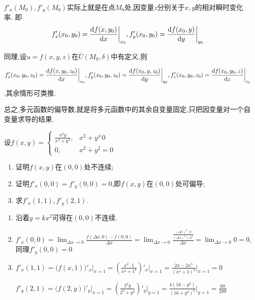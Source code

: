 $f'_x(M_0),f'_y(M_0)$实际上就是在点$M_0$处,因变量$z$分别关于$x,y$的相对瞬时变化率.
即$$f'_x(x_0,y_0)=\frac{\operatorname{d\!}{}f(x,y_0)}{\operatorname{d\!}{}x}\bigg|_{x_0},f'_y(x_0,y_0)=\frac{\operatorname{d\!}{}f(x_0,y)}{\operatorname{d\!}{}y}\bigg|_{y_0}$$

同理,设$u=f(x,y,z)$在$\bar{U}(M_0,\delta)$中有定义,则

$$f'_x(x_0,y_0,z_0)=\frac{\operatorname{d\!}{}f(x,y_0,z_0)}{\operatorname{d\!}{}x}\bigg|_{x_0},f'_y(x_0,y_0,z_0)=\frac{\operatorname{d\!}{}f(x_0,y,z_0)}{\operatorname{d\!}{}y}\bigg|_{y_0},f'_z(x_0,y_0,z_0)=\frac{\operatorname{d\!}{}f(x_0,y_0,z)}{\operatorname{d\!}{}z}\bigg|_{z_0}$$,其余情形可类推.

总之,多元函数的偏导数,就是将多元函数中的其余自变量固定,只把因变量对一个自变量求导的结果.

\begin{example}
    设$f(x,y)=\begin{cases}
        \frac{x^2y}{x^4+y^2},&x^2+y^\neq0\\
        0,&x^2+y^2=0
    \end{cases}$
    \begin{enumerate}
        \item 证明$f(x,y)$在$(0,0)$处不连续;
        \item 证明$f'_x(0,0)=f'_y(0,0)=0$,即$f(x,y)$在$(0,0)$处可偏导;
        \item 求$f'_x(1,1),f'_y(2,1)$.
    \end{enumerate}
\end{example}
\begin{solution}
    \begin{enumerate}
        \item 沿着$y=kx^2$可得在$(0,0)$不连续.
        \item $f'_x(0,0)=\lim_{\Delta x\to 0}\frac{f(\Delta x,0)-f(0,0)}{\Delta x}=\lim_{\Delta x\to 0}\frac{\frac{(\Delta x)^2\cdot 0}{(\Delta x)^4+0^2}}{\Delta x}=\lim_{\Delta x\to 0}0=0$,同理$f'_y(0,0)=0$
        \item $f'_x(1,1)=\big(f(x,1)\big)'_x\bigg|_{x=1}=\left(\frac{x^2\cdot 1}{x^4+1^2}\right)'_x\bigg|_{x=1}=\frac{2x-2x^5}{(x^4+1)^2}\bigg|_{x=1}=0$
        
        $f'_y(2,1)=\big(f(2,y)\big)'_y\bigg|_{x=1}=\left(\frac{2^2y}{2^4+y^2}\right)'_y\bigg|_{y=1}=\frac{4(16-y^2)}{(16+y^2)^2}\bigg|_{y=1}=\frac{60}{289}$
    \end{enumerate}
\end{solution}

